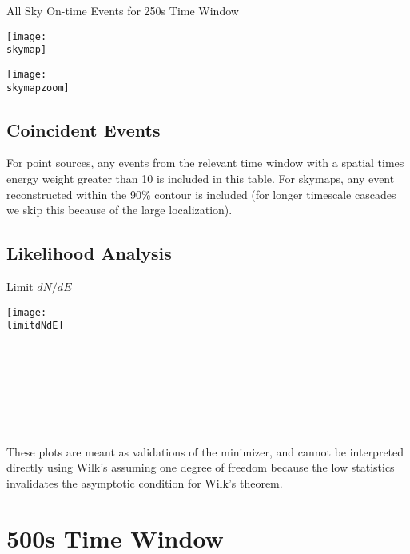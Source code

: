 \documentclass[titlepage]{article}
\begin{document}
{
  \centering
  {\Large All Sky On-time Events for 250s Time Window}

  \texttt{[image: \\skymap]}

  \texttt{[image: \\skymapzoom]}

}
\pagebreak


\subsection{Coincident Events}
For point sources, any events from the relevant time window with a spatial times energy weight greater than 10 is included in this table. For skymaps, any event reconstructed within the 90\% contour is included (for longer timescale cascades we skip this because of the large localization).
\event

\subsection{Likelihood Analysis}
\results
\pagebreak

\backgroundpdfplot

\survivialfunctionplot

\pagebreak
{
  \centering

  {\Large Limit $dN/dE$}

  \texttt{[image: \\limitdNdE]}
  \\
  \\

  \tsd

  \\
  \\
  \upperlim

  \\
  \\
  \nsscan

  These plots are meant as validations of the minimizer, and cannot be interpreted directly using Wilk's assuming one degree of freedom because the low statistics invalidates the asymptotic condition for Wilk's theorem.
}

\vfill

\pagebreak
\section{500s Time Window}
\end{document}
